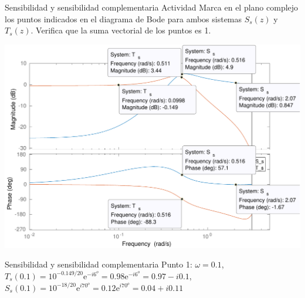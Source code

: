 \documentclass[presentation,aspectratio=169]{beamer}
\begin{document}
\begin{frame}[label={sec:org898b172}]{Sensibilidad y sensibilidad complementaria}
\alert{Actividad} Marca en el plano complejo los puntos indicados en el diagrama de Bode para ambos sistemas \(S_s(z)\) y \(T_s(z)\). Verifica que la suma vectorial de los puntos es 1.
\begin{center}
\includegraphics[width=0.7\linewidth]{../matlab/bode-sensitivity-exercise-crop}
\end{center}
\end{frame}

\begin{frame}[label={sec:org3fe051e}]{Sensibilidad y sensibilidad complementaria}
\alert{Punto 1:} \(\omega=0.1\), \(T_s(0.1) = 10^{-0.149/20}\mathrm{e}^{-i6^o} = 0.98\mathrm{e}^{-i6^o} = 0.97 - i0.1\), \(S_s(0.1) = 10^{-18/20}\mathrm{e}^{i70^o} = 0.12\mathrm{e}^{i70^o} = 0.04 + i0.11\)
\begin{center}
\end{center}
\end{frame}
\end{document}
